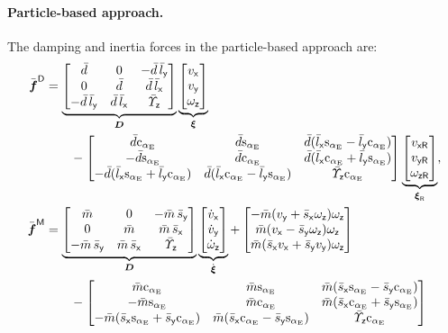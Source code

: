\paragraph{Particle-based approach.}
The damping and inertia forces in the particle-based approach are:
\begin{subequations}
\begin{align}
 \genForceDissC &=
 \underbrace{\begin{bmatrix} \dc & 0 &-\dc\,\lcy \\ 0 & \dc & \dc\,\lcx \\ -\dc\,\lcy & \dc\,\lcx & \sigcz \end{bmatrix}}_{\sysDissMat}
 \underbrace{\begin{bmatrix} \vx \\ \vy \\ \wz \end{bmatrix}}_{\sysVel}
\nonumber\\
 &\qquad-
 \begin{bmatrix} \dc\caE & \dc\saE & \dc(\lcx\saE-\lcy\caE) \\ -\dc\saE & \dc\caE & \dc(\lcx\caE+\lcy\saE) \\ -\dc(\lcx\saE+\lcy\caE) & \dc(\lcx\caE-\lcy\saE) & \sigcz\caE \end{bmatrix}
 \underbrace{\begin{bmatrix} \vxR \\ \vyR \\ \wzR \end{bmatrix}}_{\sysVelR},
\\
 \genForceInertiaC &=
 \underbrace{\begin{bmatrix} \mc & 0 &-\mc\,\scy \\ 0 & \mc & \mc\,\scx \\ -\mc\,\scy & \mc\,\scx & \sigcz \end{bmatrix}}_{\sysDissMat}
 \underbrace{\begin{bmatrix} \vxd \\ \vyd \\ \wzd \end{bmatrix}}_{\sysVeld}
 +
 \begin{bmatrix} -\mc(\vy + \scx\wz) \wz \\ \mc(\vx-\scy\wz)\wz \\ \mc(\scx\vx+\scy\vy)\wz \end{bmatrix}
\nonumber\\
 &\qquad-
 \begin{bmatrix} \mc\caE & \mc\saE & \mc(\scx\saE-\scy\caE) \\ -\mc\saE & \mc\caE & \mc(\scx\caE+\scy\saE) \\ -\mc(\scx\saE+\scy\caE) & \mc(\scx\caE-\scy\saE) & \sigcz\caE \end{bmatrix}

\end{align}
\end{subequations}
